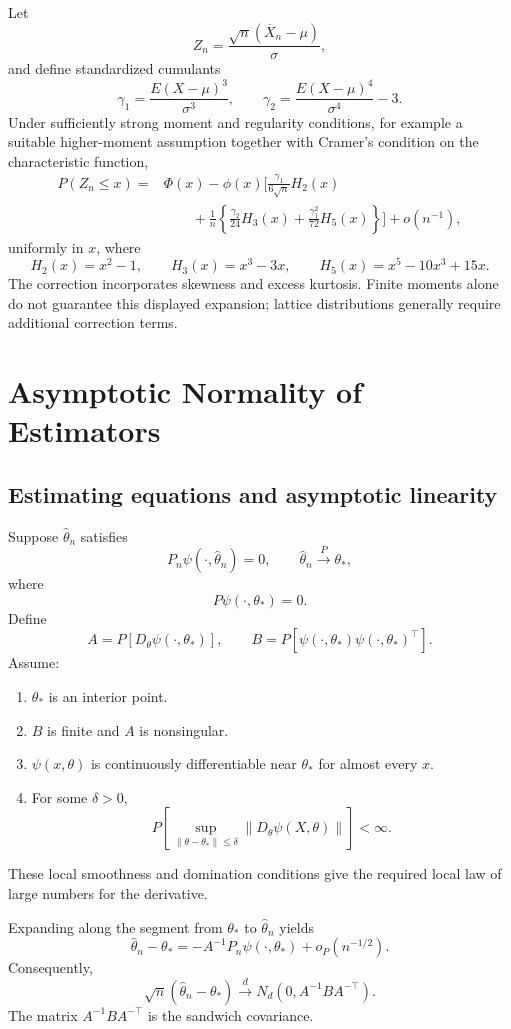 Let
\[
Z_n=\frac{\sqrt n(\overline X_n-\mu)}{\sigma},
\]
and define standardized cumulants
\[
\gamma_1=\frac{E(X-\mu)^3}{\sigma^3},
\qquad
\gamma_2=\frac{E(X-\mu)^4}{\sigma^4}-3.
\]
Under sufficiently strong moment and regularity conditions,
for example a suitable higher-moment assumption together with
Cramer's condition on the characteristic function,
\[
\begin{aligned}
P(Z_n\leq x)
={}&\Phi(x)-\phi(x)
\biggl[
\frac{\gamma_1}{6\sqrt n}H_2(x)\\
&\qquad
+\frac1n\left\{
\frac{\gamma_2}{24}H_3(x)
+\frac{\gamma_1^2}{72}H_5(x)
\right\}
\biggr]+o(n^{-1}),
\end{aligned}
\]
uniformly in $x$, where
\[
H_2(x)=x^2-1,\qquad
H_3(x)=x^3-3x,\qquad
H_5(x)=x^5-10x^3+15x.
\]
The correction incorporates skewness and excess kurtosis.
Finite moments alone do not guarantee this displayed expansion;
lattice distributions generally require additional correction terms.

\section{Asymptotic Normality of Estimators}

\subsection{Estimating equations and asymptotic linearity}

Suppose $\widehat\theta_n$ satisfies
\[
P_n\psi(\cdot,\widehat\theta_n)=0,
\qquad
\widehat\theta_n\xrightarrow{P}\theta_*,
\]
where
\[
P\psi(\cdot,\theta_*)=0.
\]
Define
\[
A=P[D_\theta\psi(\cdot,\theta_*)],
\qquad
B=P[\psi(\cdot,\theta_*)\psi(\cdot,\theta_*)^\top].
\]
Assume:
\begin{enumerate}
\item $\theta_*$ is an interior point.
\item $B$ is finite and $A$ is nonsingular.
\item $\psi(x,\theta)$ is continuously differentiable near $\theta_*$
for almost every $x$.
\item For some $\delta>0$,
\[
P\left[
\sup_{\|\theta-\theta_*\|\leq\delta}
\|D_\theta\psi(X,\theta)\|
\right]<\infty.
\]
\end{enumerate}
These local smoothness and domination conditions give the required
local law of large numbers for the derivative.

Expanding along the segment from $\theta_*$ to
$\widehat\theta_n$ yields
\[
\widehat\theta_n-\theta_*
=
-A^{-1}P_n\psi(\cdot,\theta_*)+o_P(n^{-1/2}).
\]
Consequently,
\[
\sqrt n(\widehat\theta_n-\theta_*)
\xrightarrow{d}
N_d(0,A^{-1}BA^{-\top}).
\]
The matrix $A^{-1}BA^{-\top}$ is the sandwich covariance.

